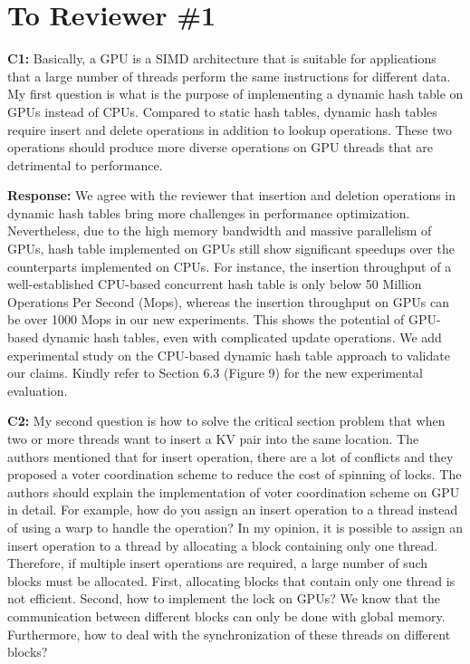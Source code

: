 \section*{To Reviewer \#1}

\begin{shaded}
	\noindent\textbf{C1:} Basically, a GPU is a SIMD architecture that is suitable for applications that a large number of threads perform the same instructions for different data. My first question is what is the purpose of implementing a dynamic hash table on GPUs instead of CPUs. Compared to static hash tables, dynamic hash tables require insert and delete operations in addition to lookup operations. These two operations should produce more diverse operations on GPU threads that are detrimental to performance.
\end{shaded}
%
\noindent\textbf{Response:} 
We agree with the reviewer that insertion and deletion operations in dynamic hash tables bring more 
challenges in performance optimization. Nevertheless, due to the high memory bandwidth and massive parallelism of GPUs, hash table implemented on GPUs still show significant speedups over the counterparts implemented on CPUs. For instance, the insertion throughput of a well-established CPU-based concurrent hash table \cite{li2014algorithmic} is only below 50 Million Operations Per Second (Mops), whereas the insertion throughput on GPUs can be over 1000 Mops in our new experiments. This shows the potential of GPU-based dynamic hash tables, even with complicated update operations. We add experimental study on the CPU-based dynamic hash table approach to validate our claims. Kindly refer to Section 6.3 (Figure 9) for the new experimental evaluation. 

\begin{shaded}
	\noindent\textbf{C2:} My second question is how to solve the critical section problem that when two or more threads want to insert a KV pair into the same location. The authors mentioned that for insert operation, there are a lot of conflicts and they proposed a voter coordination scheme to reduce the cost of spinning of locks. The authors should explain the implementation of voter coordination scheme on GPU in detail. For example, how do you assign an insert operation to a thread instead of using a warp to handle the operation? In my opinion, it is possible to assign an insert operation to a thread by allocating a block containing only one thread. Therefore, if multiple insert operations are required, a large number of such blocks must be allocated. First, allocating blocks that contain only one thread is not efficient. Second, how to implement the lock on GPUs? We know that the communication between different blocks can only be done with global memory. Furthermore, how to deal with the synchronization of these threads on different blocks? 
\end{shaded}

